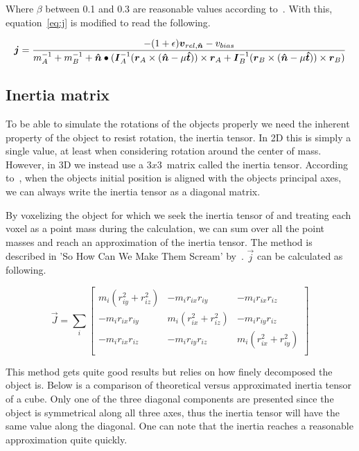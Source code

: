 Where $\beta$ between 0.1 and 0.3 are reasonable values according to~\cite{catto2006}.
With this, equation~\ref{eq:j} is modified to read the following.

\begin{equation}\label{eq:finalJ}
  \boldsymbol{j} = \frac{-(1+\epsilon)\boldsymbol{v}_{rel,\boldsymbol{\hat{n}}}-v_{bias}}
  {m_A^{-1}+m_B^{-1}+\boldsymbol{\hat{n}}\bullet(\boldsymbol{I}_A^{-1}(\boldsymbol{r}_A\times(\boldsymbol{\hat{n}}-\mu\boldsymbol{\hat{t}}))\times\boldsymbol{r}_A
  +\boldsymbol{I}_B^{-1}(\boldsymbol{r}_B\times(\boldsymbol{\hat{n}}-\mu\boldsymbol{\hat{t}}))\times\boldsymbol{r}_B)}
\end{equation}

\subsection{Inertia matrix}
To be able to simulate the rotations of the objects properly we need the inherent
property of the object to resist rotation, the inertia tensor.
In 2D this is simply a single value, at least when considering rotation around
the center of mass. However, in 3D we instead use a $3x3$ matrix called the
inertia tensor. According to~\cite{ragnemalmscream}, when the objects initial
position is aligned with the objects principal axes, we can always write the inertia tensor
as a diagonal matrix.

By voxelizing the object for which we seek the inertia tensor of and treating each voxel
as a point mass during the calculation, we can sum over all the point masses and reach
an approximation of the inertia tensor. The method is described in
 'So How Can We Make Them Scream' by~\cite{ragnemalmscream}.
$\vec{j}$ can be calculated as following.

 \begin{equation}
  \vec{J} = \sum_i
  \begin{bmatrix}
    m_i(r_{iy}^2 + r_{iz}^2) & -m_ir_{ix}r_{iy} & -m_ir_{ix}r_{iz} \\
    -m_ir_{ix}r_{iy} & m_i(r_{ix}^2 + r_{iz}^2) & -m_ir_{iy}r_{iz} \\
    -m_ir_{ix}r_{iz} & -m_ir_{iy}r_{iz} & m_i(r_{ix}^2 + r_{iy}^2) \\
  \end{bmatrix}
 \end{equation}

 This method gets quite
 good results but relies on how finely decomposed the object is.
 Below is a comparison of theoretical versus approximated inertia tensor of a cube.
 Only one of the three diagonal components are presented since the object is symmetrical
 along all three axes, thus the inertia tensor will have the same value along the diagonal.
 One can note that the inertia reaches a reasonable approximation quite quickly.


